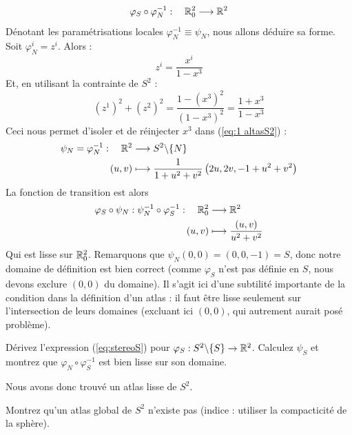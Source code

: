 \begin{equation}
    \varphi_S \circ \varphi_N^{-1} : \quad \mathbb{R}^2_0 \longrightarrow \mathbb{R}^2
\end{equation}
Dénotant les paramétrisations locales $\varphi^{-1}_N \equiv \psi_N$, nous allons déduire sa forme. Soit $\varphi_N^i = z^i$. Alors :
\begin{equation}
\label{eq:1 altasS2}
    z^i = \frac{x^i}{1-x^3}
\end{equation}
Et, en utilisant la contrainte de $S^2$ :
\begin{equation}
    (z^1)^2 + (z^2)^2 = \frac{1 - (x^3)^2}{(1-x^3)^2} = \frac{1 + x^3}{1-x^3}
\end{equation}
Ceci nous permet d'isoler et de réinjecter $x^3$ dans (\ref{eq:1 altasS2}) :
\begin{align}
    \psi_N = \varphi_N^{-1}: \quad \mathbb{R}^2 &\longrightarrow S^2\backslash \{N\}\\
    (u,v) &\longmapsto \frac{1}{1+u^2 +v^2} \left( 2 u,2v, -1 + u^2+v^2 \right)
\end{align}
La fonction de transition est alors
\begin{align}
    \varphi_S \circ \psi_N : \psi^{-1}_N \circ \varphi^{-1}_S :\quad \mathbb{R}^2_0 &\longrightarrow \mathbb{R}^2\\
    (u,v) &\longmapsto \frac{(u,v)}{u^2+v^2}
\end{align}
Qui est lisse sur $\mathbb{R}^2_0$. Remarquons que $\psi_N(0,0) = (0,0,-1)=S$, donc notre domaine de définition est bien correct (comme $\varphi_S$ n'est pas définie en $S$, nous devons exclure $(0,0)$ du domaine). Il s'agit ici d'une subtilité importante de la condition dans la définition d'un atlas : il faut être lisse seulement sur l'intersection de leurs domaines (excluant ici $(0,0)$, qui autrement aurait posé problème).
\begin{exerc}
    Dérivez l'expression (\ref{eq:stereoS}) pour $\varphi_S : S^2\backslash \{ S\} \to \mathbb{R}^2$. Calculez $\psi_S$ et montrez que $\varphi_N \circ \varphi_S^{-1}$ est bien lisse sur son domaine. 
\end{exerc}
Nous avons donc trouvé un atlas lisse de $S^2$.
\begin{exerc}
    Montrez qu'un atlas global de $S^2$ n'existe pas (indice : utiliser la compacticité de la sphère).
\end{exerc}
